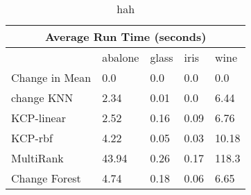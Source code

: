 
\begin{table}[!ht]
\centering
{
\begin{tabular}{ |p{2cm}|p{1.5cm}|p{1.5cm}|p{1.5cm}|p{1.5cm}|}
\hline
\multicolumn{5}{|c|}{Average Run Time (seconds)} \\
\hline

\hline
 & abalone & glass & iris & wine \\
\hline
\hline
Change in Mean & 0.0 & 0.0 & 0.0 & 0.0 \\
change KNN & 2.34 & 0.01 & 0.0 & 6.44 \\
KCP-linear & 2.52 & 0.16 & 0.09 & 6.76 \\
KCP-rbf & 4.22 & 0.05 & 0.03 & 10.18 \\
MultiRank & 43.94 & 0.26 & 0.17 & 118.3 \\
Change Forest & 4.74 & 0.18 & 0.06 & 6.65 \\
\hline
\end{tabular}}
\\
\caption{hah}
\vspace{10pt}
\label{tab:yourlabel}
\end{table}